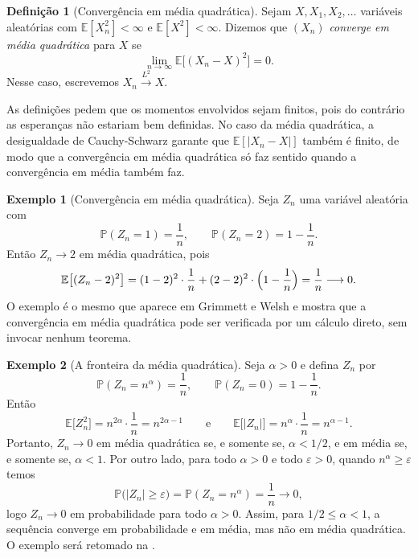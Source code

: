 \documentclass[12pt,portuguese]{article}
\theoremstyle{definition}
\newtheorem{definition}[definition]{Definição}
\newtheorem{example}[example]{Exemplo}
\theoremstyle{plainexercise}
\theoremstyle{starredexercise}
\theoremstyle{definition}
\begin{document}
\begin{definition}[Convergência em média quadrática]\label{def:media-quadratica}
Sejam $X,X_1,X_2,\ldots$ variáveis aleatórias com $\mathbb{E}[X_n^2]<\infty$ e
$\mathbb{E}[X^2]<\infty$. Dizemos que $(X_n)$ \emph{converge em média
quadrática} para $X$ se
\[
\lim_{n\to\infty}\mathbb{E}\bigl[(X_n-X)^2\bigr]=0.
\]
Nesse caso, escrevemos $X_n\xrightarrow{L^2}X$.
\end{definition}

As definições pedem que os momentos envolvidos sejam finitos, pois do contrário
as esperanças não estariam bem definidas. No caso da média quadrática, a
desigualdade de Cauchy-Schwarz garante que $\mathbb{E}[|X_n-X|]$ também é finito,
de modo que a convergência em média quadrática só faz sentido quando a
convergência em média também faz.

\begin{example}[Convergência em média quadrática]\label{ex:media-quadratica}
Seja $Z_n$ uma variável aleatória com
\[
\mathbb{P}(Z_n=1)=\frac{1}{n},
\qquad
\mathbb{P}(Z_n=2)=1-\frac{1}{n}.
\]
Então $Z_n\to2$ em média quadrática, pois
\[
\mathbb{E}\bigl[(Z_n-2)^2\bigr]
=
(1-2)^2\cdot\frac{1}{n}+(2-2)^2\cdot\Bigl(1-\frac{1}{n}\Bigr)
=
\frac{1}{n}\longrightarrow0.
\]
O exemplo é o mesmo que aparece em Grimmett e Welsh e mostra que a convergência
em média quadrática pode ser verificada por um cálculo direto, sem invocar
nenhum teorema.
\end{example}

\begin{example}[A fronteira da média quadrática]\label{ex:media-quadratica-alfa}
Seja $\alpha>0$ e defina $Z_n$ por
\[
\mathbb{P}(Z_n=n^\alpha)=\frac{1}{n},
\qquad
\mathbb{P}(Z_n=0)=1-\frac{1}{n}.
\]
Então
\[
\mathbb{E}\bigl[Z_n^2\bigr]=n^{2\alpha}\cdot\frac{1}{n}=n^{2\alpha-1}
\qquad\text{e}\qquad
\mathbb{E}\bigl[|Z_n|\bigr]=n^\alpha\cdot\frac{1}{n}=n^{\alpha-1}.
\]
Portanto, $Z_n\to0$ em média quadrática se, e somente se, $\alpha<1/2$, e em
média se, e somente se, $\alpha<1$. Por outro lado, para todo $\alpha>0$ e todo $\varepsilon>0$,
quando $n^\alpha\geqslant\varepsilon$ temos
\[
\mathbb{P}\bigl(|Z_n|\geqslant\varepsilon\bigr)
=
\mathbb{P}(Z_n=n^\alpha)
=
\frac{1}{n}\longrightarrow0,
\]
logo $Z_n\to0$ em probabilidade para todo $\alpha>0$. Assim, para
$1/2\leqslant\alpha<1$, a sequência converge em probabilidade e em média, mas
não em média quadrática. O exemplo será retomado na
.
\end{example}
\end{document}
